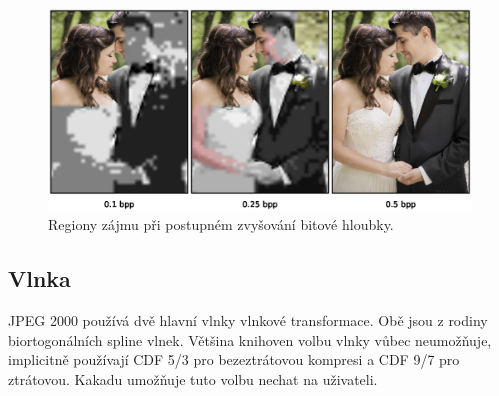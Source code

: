 \begin{figure}[hbt!]
  \centering
  \hspace*{-0.75cm}
  \includegraphics[width=16cm]{obrazky-figures/roi/roi.eps}
  \caption{Regiony zájmu při postupném zvyšování bitové hloubky.}
\end{figure}

%
%
\newpage
\subsection*{Vlnka}
JPEG 2000 používá dvě hlavní vlnky vlnkové transformace. Obě jsou z rodiny biortogonálních spline vlnek. Většina knihoven volbu vlnky vůbec neumožňuje, implicitně používají CDF 5/3 pro bezeztrátovou kompresi a CDF 9/7 pro ztrátovou. Kakadu umožňuje tuto volbu nechat na uživateli. 

